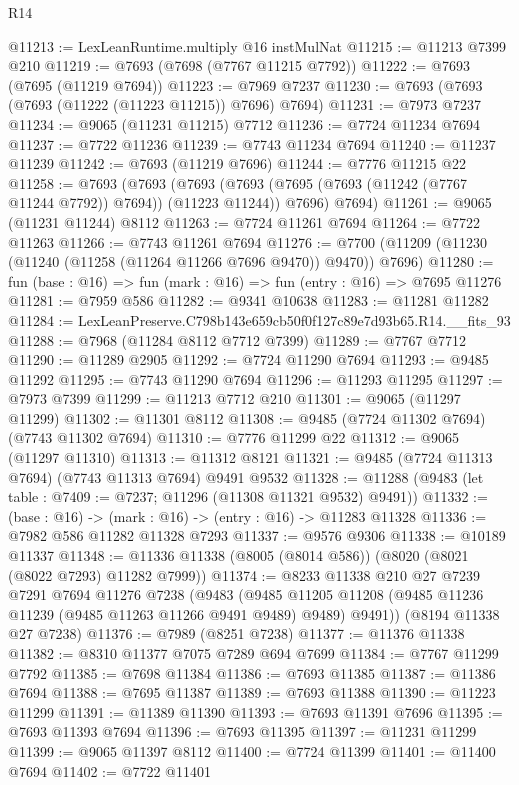 \begin{lexlean}{R14}
\begin{coremodule}
@11213 := LexLeanRuntime.multiply @16 instMulNat
@11215 := @11213 @7399 @210
@11219 := @7693 (@7698 (@7767 @11215 @7792))
@11222 := @7693 (@7695 (@11219 @7694))
@11223 := @7969 @7237
@11230 := @7693 (@7693 (@7693 (@11222 (@11223 @11215)) @7696) @7694)
@11231 := @7973 @7237
@11234 := @9065 (@11231 @11215) @7712
@11236 := @7724 @11234 @7694
@11237 := @7722 @11236
@11239 := @7743 @11234 @7694
@11240 := @11237 @11239
@11242 := @7693 (@11219 @7696)
@11244 := @7776 @11215 @22
@11258 := @7693
    (@7693
      (@7693 (@7693 (@7695 (@7693 (@11242 (@7767 @11244 @7792)) @7694)) (@11223 @11244)) @7696)
      @7694)
@11261 := @9065 (@11231 @11244) @8112
@11263 := @7724 @11261 @7694
@11264 := @7722 @11263
@11266 := @7743 @11261 @7694
@11276 := @7700 (@11209 (@11230 (@11240 (@11258 (@11264 @11266 @7696 @9470)) @9470)) @7696)
@11280 := fun (base : @16) => fun (mark : @16) => fun (entry : @16) => @7695 @11276
@11281 := @7959 @586
@11282 := @9341 @10638
@11283 := @11281 @11282
@11284 := LexLeanPreserve.C798b143e659cb50f0f127c89e7d93b65.R14.__fits_93
@11288 := @7968 (@11284 @8112 @7712 @7399)
@11289 := @7767 @7712
@11290 := @11289 @2905
@11292 := @7724 @11290 @7694
@11293 := @9485 @11292
@11295 := @7743 @11290 @7694
@11296 := @11293 @11295
@11297 := @7973 @7399
@11299 := @11213 @7712 @210
@11301 := @9065 (@11297 @11299)
@11302 := @11301 @8112
@11308 := @9485 (@7724 @11302 @7694) (@7743 @11302 @7694)
@11310 := @7776 @11299 @22
@11312 := @9065 (@11297 @11310)
@11313 := @11312 @8121
@11321 := @9485 (@7724 @11313 @7694) (@7743 @11313 @7694) @9491 @9532
@11328 := @11288 (@9483 (let table : @7409 := @7237; @11296 (@11308 @11321 @9532) @9491))
@11332 := (base : @16) -> (mark : @16) -> (entry : @16) -> @11283 @11328
@11336 := @7982 @586 @11282 @11328 @7293
@11337 := @9576 @9306
@11338 := @10189 @11337
@11348 := @11336 @11338 (@8005 (@8014 @586)) (@8020 (@8021 (@8022 @7293) @11282 @7999))
@11374 := @8233
    @11338
    @210
    @27
    @7239
    @7291
    @7694
    @11276
    @7238
    (@9483
      (@9485 @11205 @11208 (@9485 @11236 @11239 (@9485 @11263 @11266 @9491 @9489) @9489) @9491))
    (@8194 @11338 @27 @7238)
@11376 := @7989 (@8251 @7238)
@11377 := @11376 @11338
@11382 := @8310 @11377 @7075 @7289 @694 @7699
@11384 := @7767 @11299 @7792
@11385 := @7698 @11384
@11386 := @7693 @11385
@11387 := @11386 @7694
@11388 := @7695 @11387
@11389 := @7693 @11388
@11390 := @11223 @11299
@11391 := @11389 @11390
@11393 := @7693 @11391 @7696
@11395 := @7693 @11393 @7694
@11396 := @7693 @11395
@11397 := @11231 @11299
@11399 := @9065 @11397 @8112
@11400 := @7724 @11399
@11401 := @11400 @7694
@11402 := @7722 @11401

\end{coremodule}
\end{lexlean}
